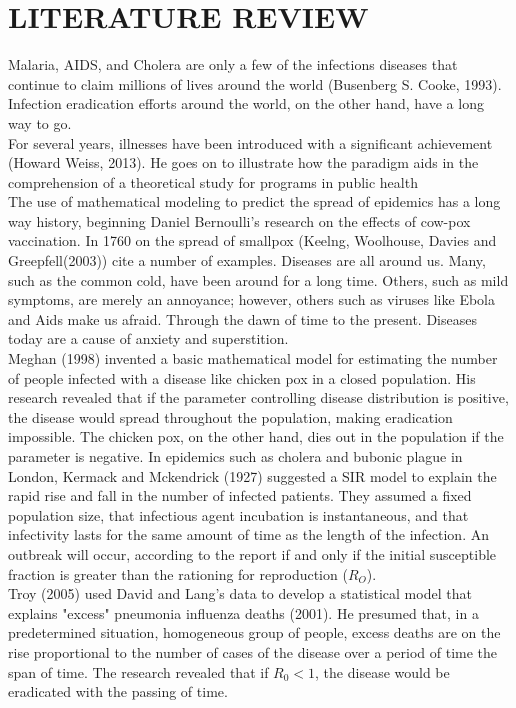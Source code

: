 \documentclass[12pt]{report}
\newcommand{\spn}[1]{\\[#1cm]}
\newcommand{\NI}{\noindent}
\begin{document}
	\chapter{LITERATURE REVIEW}
	Malaria, AIDS, and Cholera are only a few of the infections diseases that continue to claim millions of lives around the world (Busenberg S. Cooke, 1993). Infection eradication efforts around the world, on the other hand, have a long way to go.\spn{0.5}
	For several years, illnesses have been introduced with a significant achievement (Howard Weiss, 2013). He goes on to illustrate how the paradigm aids in the comprehension of a theoretical study for programs in public health\spn{0.5}
	The use of mathematical modeling to predict the spread of epidemics has a long way history, beginning Daniel Bernoulli's research on the effects of cow-pox vaccination. In 1760 on the spread of smallpox (Keelng, Woolhouse, Davies and Greepfell(2003)) cite a number of examples. Diseases are all  around us. Many, such as the common cold, have been around for a long time. Others, such as mild symptoms, are merely an annoyance; however, others such as viruses like Ebola and Aids make us afraid. Through the dawn of time to the present. Diseases today are a cause of anxiety and superstition.\\
	
	\NI Meghan (1998) invented a basic mathematical model for estimating the number of people infected with a disease like chicken pox in a closed population. His research revealed that if the parameter controlling disease distribution is positive, the disease would spread throughout the population, making eradication impossible. The chicken pox, on the other hand, dies out in the population if the parameter is negative. In epidemics such as cholera and bubonic plague in London, Kermack and Mckendrick (1927) suggested a SIR model to explain the rapid rise and fall in the number of infected patients. They assumed a fixed population size, that infectious agent incubation is instantaneous, and that infectivity lasts for the same amount of time as the length of the infection. An outbreak will occur, according to the report if and only if the initial susceptible fraction is greater than the rationing for reproduction ($R_O$).\\
	
	\NI Troy (2005) used David and Lang's data to develop a statistical model that explains "excess" pneumonia influenza deaths (2001). He presumed that, in a predetermined situation, homogeneous group of people, excess deaths are on the rise proportional to the number of cases of the disease over a period of time the span of time. The research revealed that if $R_0 < 1$, the disease would be eradicated with the passing of time.\\
	
\end{document}
